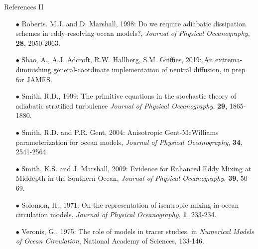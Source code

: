 \documentclass{beamer}
\begin{document}
\begin{frame}{References II}
\begin{itemize}
\item[$\bullet$] Roberts. M.J. and D. Marshall, 1998: 
Do we require adiabatic dissipation schemes in eddy-resolving ocean models?,  {\it Journal of Physical Oceanography}, {\bf 28}, 2050-2063.

\item[$\bullet$] Shao, A., A.J. Adcroft, R.W. Hallberg, S.M. Griffies, 2019: An extrema-diminishing general-coordinate implementation of neutral diffusion, in prep for JAMES. 

\item[$\bullet$] Smith, R.D., 1999: The primitive equations in the stochastic theory of adiabatic stratified turbulence {\it Journal of Physical Oceanography}, {\bf 29}, 1865-1880.

\item[$\bullet$] Smith, R.D. and P.R. Gent, 2004: Anisotropic Gent-McWilliams parameterization for ocean models, {\it Journal of Physical Oceanography}, {\bf 34}, 2541-2564.

\item[$\bullet$] Smith, K.S. and J. Marshall, 2009:
Evidence for Enhanced Eddy Mixing at Middepth in the Southern Ocean, {\it Journal of Physical Oceanography}, 
{\bf 39}, 50-69.

\item[$\bullet$] Solomon, H., 1971: On the representation of isentropic mixing in ocean circulation models, {\it Journal of Physical Oceanography}, {\bf 1}, 233-234.

\item[$\bullet$] Veronis, G., 1975: The role of models in tracer studies, in {\it Numerical Models of Ocean Circulation}, National Academy of Sciences, 133-146. 


\end{itemize}

\end{frame}
\end{document}
